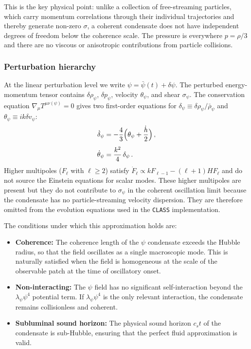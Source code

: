 \documentclass[epj]{svjour}
\begin{document}
This is the key physical point: unlike a collection of free-streaming
particles, which carry momentum correlations through their individual
trajectories and thereby generate non-zero $\sigma$, a coherent
condensate does not have independent degrees of freedom below the
coherence scale. The pressure is everywhere $p=\rho/3$ and there are
no viscous or anisotropic contributions from particle collisions.

\subsubsection{Perturbation hierarchy}

At the linear perturbation level we write $\psi=\bar\psi(t)+\delta\psi$.
The perturbed energy-momentum tensor contains
$\delta\rho_\psi$, $\delta p_\psi$, velocity $\theta_\psi$, and shear
$\sigma_\psi$. The conservation equation
$\nabla_\mu T^{\mu\nu(\psi)}=0$ gives two first-order equations
for $\delta_\psi\equiv\delta\rho_\psi/\bar\rho_\psi$ and
$\theta_\psi\equiv ik\delta v_\psi$:
\begin{align}
\dot\delta_\psi
&=-\frac{4}{3}\Bigl(\theta_\psi+\frac{\dot h}{2}\Bigr)\,,
\label{eq:delta_pfd_main}\\[4pt]
\dot\theta_\psi
&=\frac{k^2}{4}\,\delta_\psi\,.
\label{eq:theta_pfd_main}
\end{align}
Higher multipoles ($F_\ell$ with $\ell\ge2$) satisfy
$\dot F_\ell\propto k F_{\ell-1}-(\ell+1)H F_\ell$ and do not source
the Einstein equations for scalar modes. These higher multipoles are
present but they do not contribute to $\sigma_\psi$ in the coherent
oscillation limit because the condensate has no particle-streaming
velocity dispersion. They are therefore omitted from the evolution
equations used in the \texttt{CLASS} implementation.

The conditions under which this approximation holds are:
\begin{itemize}
\item \textbf{Coherence:} The coherence length of the $\psi$
condensate exceeds the Hubble radius, so that the field oscillates as
a single macroscopic mode. This is naturally satisfied when the
field is homogeneous at the scale of the observable patch at the time
of oscillatory onset.
\item \textbf{Non-interacting:} The $\psi$ field has no significant
self-interaction beyond the $\lambda_\psi\psi^4$ potential term.
If $\lambda_\psi\psi^4$ is the only relevant interaction, the
condensate remains collisionless and coherent.
\item \textbf{Subluminal sound horizon:} The physical sound horizon
$c_s t$ of the condensate is sub-Hubble, ensuring that the perfect
fluid approximation is valid.
\end{itemize}
\end{document}
